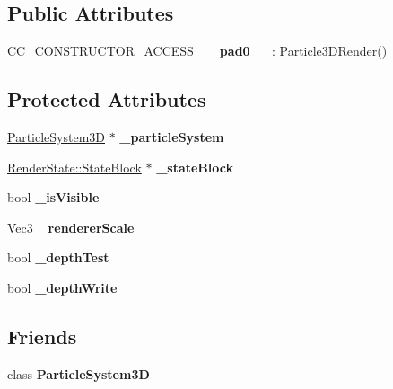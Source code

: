 \subsection*{Public Attributes}
\begin{DoxyCompactItemize}
\item 
\mbox{\label{classParticle3DRender_a37a2f1878bfb3039a13306c28acd3d8e}} 
\hyperlink{_2cocos2d_2cocos_2base_2ccConfig_8h_a25ef1314f97c35a2ed3d029b0ead6da0}{C\+C\+\_\+\+C\+O\+N\+S\+T\+R\+U\+C\+T\+O\+R\+\_\+\+A\+C\+C\+E\+SS} {\bfseries \+\_\+\+\_\+pad0\+\_\+\+\_\+}\+: \hyperlink{classParticle3DRender}{Particle3\+D\+Render}()
\end{DoxyCompactItemize}
\subsection*{Protected Attributes}
\begin{DoxyCompactItemize}
\item 
\mbox{\label{classParticle3DRender_a67d518d58ae500587e5fb9c80624e280}} 
\hyperlink{classParticleSystem3D}{Particle\+System3D} $\ast$ {\bfseries \+\_\+particle\+System}
\item 
\mbox{\label{classParticle3DRender_a3ef9c55fbcc360d8043e3d797d0c0c6c}} 
\hyperlink{classRenderState_1_1StateBlock}{Render\+State\+::\+State\+Block} $\ast$ {\bfseries \+\_\+state\+Block}
\item 
\mbox{\label{classParticle3DRender_af88ce70445b61ba95732a5d2315e0449}} 
bool {\bfseries \+\_\+is\+Visible}
\item 
\mbox{\label{classParticle3DRender_aa88f284b49dc5ad971bcb83a173d5d37}} 
\hyperlink{classVec3}{Vec3} {\bfseries \+\_\+renderer\+Scale}
\item 
\mbox{\label{classParticle3DRender_a8acbdb561a51258422c825d3623a4edd}} 
bool {\bfseries \+\_\+depth\+Test}
\item 
\mbox{\label{classParticle3DRender_a6781a0827c422ddc48e7121e7d181535}} 
bool {\bfseries \+\_\+depth\+Write}
\end{DoxyCompactItemize}
\subsection*{Friends}
\begin{DoxyCompactItemize}
\item 
\mbox{\label{classParticle3DRender_a372ad87c704d67c7a8060c019dba790b}} 
class {\bfseries Particle\+System3D}
\end{DoxyCompactItemize}
